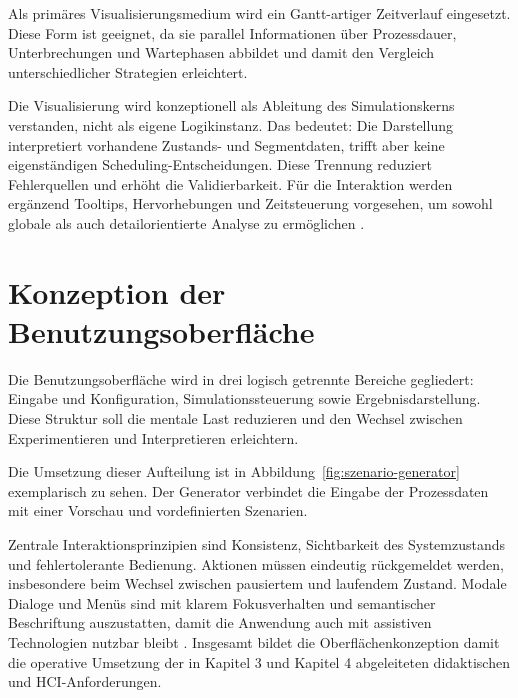Als primäres Visualisierungsmedium wird ein Gantt-artiger Zeitverlauf eingesetzt. Diese Form ist geeignet, da sie parallel Informationen über Prozessdauer, Unterbrechungen und Wartephasen abbildet und damit den Vergleich unterschiedlicher Strategien erleichtert.

Die Visualisierung wird konzeptionell als Ableitung des Simulationskerns verstanden, nicht als eigene Logikinstanz. Das bedeutet: Die Darstellung interpretiert vorhandene Zustands- und Segmentdaten, trifft aber keine eigenständigen Scheduling-Entscheidungen. Diese Trennung reduziert Fehlerquellen und erhöht die Validierbarkeit. Für die Interaktion werden ergänzend Tooltips, Hervorhebungen und Zeitsteuerung vorgesehen, um sowohl globale als auch detailorientierte Analyse zu ermöglichen \cite{hundhausen2002meta,stasko1998software}.

\section{Konzeption der Benutzungsoberfläche}

Die Benutzungsoberfläche wird in drei logisch getrennte Bereiche gegliedert: Eingabe und Konfiguration, Simulationssteuerung sowie Ergebnisdarstellung. Diese Struktur soll die mentale Last reduzieren und den Wechsel zwischen Experimentieren und Interpretieren erleichtern.

Die Umsetzung dieser Aufteilung ist in Abbildung~\ref{fig:szenario-generator} exemplarisch zu sehen. Der Generator verbindet die Eingabe der Prozessdaten mit einer Vorschau und vordefinierten Szenarien.



Zentrale Interaktionsprinzipien sind Konsistenz, Sichtbarkeit des Systemzustands und fehlertolerante Bedienung. Aktionen müssen eindeutig rückgemeldet werden, insbesondere beim Wechsel zwischen pausiertem und laufendem Zustand. Modale Dialoge und Menüs sind mit klarem Fokusverhalten und semantischer Beschriftung auszustatten, damit die Anwendung auch mit assistiven Technologien nutzbar bleibt \cite{wcag2018}. Insgesamt bildet die Oberflächenkonzeption damit die operative Umsetzung der in Kapitel 3 und Kapitel 4 abgeleiteten didaktischen und HCI-Anforderungen.
